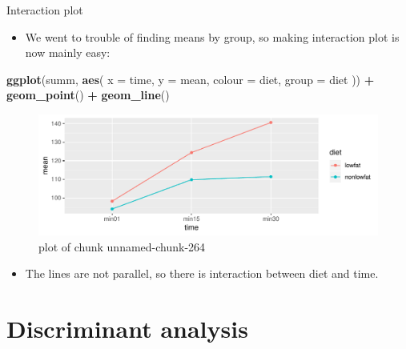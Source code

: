 \documentclass[ignorenonframetext,]{beamer}
\newenvironment{Shaded}{\begin{snugshade}}{\end{snugshade}}
\newcommand{\DataTypeTok}[1]{\textcolor[rgb]{0.13,0.29,0.53}{#1}}
\newcommand{\KeywordTok}[1]{\textcolor[rgb]{0.13,0.29,0.53}{\textbf{#1}}}
\newcommand{\NormalTok}[1]{#1}
\newcommand{\OperatorTok}[1]{\textcolor[rgb]{0.81,0.36,0.00}{\textbf{#1}}}
\newcommand{\StringTok}[1]{\textcolor[rgb]{0.31,0.60,0.02}{#1}}
\providecommand{\tightlist}{%
  \setlength{\itemsep}{0pt}\setlength{\parskip}{0pt}}
\begin{document}
\begin{frame}[fragile]{Interaction plot}
\protect\hypertarget{interaction-plot-4}{}

\begin{itemize}
\tightlist
\item
  We went to trouble of finding means by group, so making interaction
  plot is now mainly easy:
\end{itemize}

\begin{Shaded}
\begin{Highlighting}[]
\KeywordTok{ggplot}\NormalTok{(summ, }\KeywordTok{aes}\NormalTok{(}
  \DataTypeTok{x =}\NormalTok{ time, }\DataTypeTok{y =}\NormalTok{ mean, }\DataTypeTok{colour =}\NormalTok{ diet,}
  \DataTypeTok{group =}\NormalTok{ diet}
\NormalTok{)) }\OperatorTok{+}\StringTok{ }\KeywordTok{geom_point}\NormalTok{() }\OperatorTok{+}\StringTok{ }\KeywordTok{geom_line}\NormalTok{()}
\end{Highlighting}
\end{Shaded}

\begin{figure}
\centering
\includegraphics{figure/unnamed-chunk-264-1.pdf}
\caption{plot of chunk unnamed-chunk-264}
\end{figure}

\begin{itemize}
\tightlist
\item
  The lines are not parallel, so there is interaction between diet and
  time.
\end{itemize}

\section{Discriminant analysis}
\frame{\sectionpage}

\end{frame}
\end{document}
